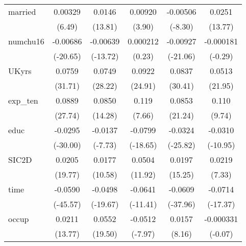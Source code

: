 \begin{table}[htbp]
\begin{tabular}{l*{5}{c}}
married     &     0.00329\sym{***}&      0.0146\sym{***}&     0.00920\sym{***}&    -0.00506\sym{***}&      0.0251\sym{***}\\
            &      (6.49)         &     (13.81)         &      (3.90)         &     (-8.30)         &     (13.77)         \\
numchu16    &    -0.00686\sym{***}&    -0.00639\sym{***}&    0.000212         &    -0.00927\sym{***}&   -0.000181         \\
            &    (-20.65)         &    (-13.72)         &      (0.23)         &    (-21.06)         &     (-0.29)         \\
UKyrs       &      0.0759\sym{***}&      0.0749\sym{***}&      0.0922\sym{***}&      0.0837\sym{***}&      0.0513\sym{***}\\
            &     (31.71)         &     (28.22)         &     (24.91)         &     (30.41)         &     (21.95)         \\
exp\_ten     &      0.0889\sym{***}&      0.0850\sym{***}&       0.119\sym{***}&      0.0853\sym{***}&       0.110\sym{***}\\
            &     (27.74)         &     (14.28)         &      (7.66)         &     (21.24)         &      (9.74)         \\
educ        &     -0.0295\sym{***}&     -0.0137\sym{***}&     -0.0799\sym{***}&     -0.0324\sym{***}&     -0.0310\sym{***}\\
            &    (-30.00)         &     (-7.73)         &    (-18.65)         &    (-25.82)         &    (-10.95)         \\
SIC2D       &      0.0205\sym{***}&      0.0177\sym{***}&      0.0504\sym{***}&      0.0197\sym{***}&      0.0219\sym{***}\\
            &     (19.77)         &     (10.58)         &     (11.92)         &     (15.25)         &      (7.33)         \\
time        &     -0.0590\sym{***}&     -0.0498\sym{***}&     -0.0641\sym{***}&     -0.0609\sym{***}&     -0.0714\sym{***}\\
            &    (-45.57)         &    (-19.67)         &    (-11.41)         &    (-37.96)         &    (-17.37)         \\
occup       &      0.0211\sym{***}&      0.0552\sym{***}&     -0.0512\sym{***}&      0.0157\sym{***}&   -0.000331         \\
            &     (13.77)         &     (19.50)         &     (-7.97)         &      (8.16)         &     (-0.07)         \\

\end{tabular}
\end{table}
